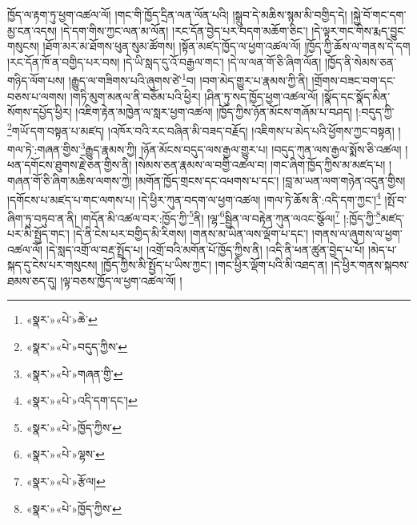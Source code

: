 ཁྱོད་ལ་རྟག་ཏུ་ཕྱག་འཚལ་ལོ། །གང་གི་ཁྱོད་དྲིན་ལན་ལོན་པའི། །སྒྲུབ་དེ་མཆིས་སྙམ་མི་བགྱིད་དེ། །སྐྱེ་བོ་གང་དག་མྱ་ངན་འདས། །དེ་དག་གིས་ཀྱང་ལན་མ་ལོན། །རང་དོན་བྱེད་པར་བདག་མཆོག་ཅིང་། །དེ་ལྟར་གང་གིས་རྨད་བྱུང་གསུངས། །ཐོག་མར་མ་ཐོགས་ཕུན་སུམ་ཚོགས། །སྟོན་མཛད་ཁྱོད་ལ་ཕྱག་འཚལ་ལོ། །ཁྱོད་ཀྱི་ཆོས་ལ་གནས་དེ་དག །རང་དོན་ཁོ་ན་བགྱིད་པར་བས། །དེ་ཡི་སླད་དུ་འོ་བརྒྱལ་གང་། །དེ་ལ་ལན་གོ་ཅི་ཞིག་ལོན། །ཁྱོད་ནི་སེམས་ཅན་གཉིད་ལོག་པས། །རྒྱུད་ལ་གཟིགས་པའི་ཞུགས་ཙེ་\footnote{«སྣར་»«པེ་»ཆེ་}བ། །བག་མེད་གྱུར་པ་རྣམས་ཀྱི་ནི། །གྲོགས་བཟང་བག་དང་བཅས་པ་ལགས། །གཏི་མུག་མནལ་ནི་བཅོམ་པའི་ཕྱིར། །ཤིན་ཏུ་སད་ཁྱོད་ཕྱག་འཚལ་ལོ། །སྣོད་དང་སྣོད་མིན་སོགས་དཔྱོད་ཕྱིར། །འཇིག་རྟེན་མཁྱེན་ལ་སླར་ཕྱག་འཚལ། །ཁྱོད་ཀྱིས་ཉོན་མོངས་གཞོམ་པ་བཤད། །:བདུད་ཀྱི་\footnote{«སྣར་»«པེ་»བདུད་ཀྱིས་}གཡོ་དག་བསྟན་པ་མཛད། །འཁོར་བའི་རང་བཞིན་མི་བཟད་བརྗོད། །འཇིགས་པ་མེད་པའི་ཕྱོགས་ཀྱང་བསྟན། །གལ་ཏེ་:གཞན་གྱིས་\footnote{«སྣར་»«པེ་»གཞན་གྱི་}རྒྱུད་རྣམས་ཀྱི། །ཉོན་མོངས་བདུད་ལས་རྒྱལ་གྱུར་པ། །བདུད་ཀུན་ལས་རྒྱལ་སྨོས་ཅི་འཚལ། །ཕན་དགོངས་ཐུགས་རྗེ་ཅན་གྱིས་ནི། །སེམས་ཅན་རྣམས་ལ་བགྱི་འཚལ་བ། །གང་ཞིག་ཁྱོད་ཀྱིས་མ་མཛད་པ། །གཞན་གོ་ཅི་ཞིག་མཆིས་ལགས་ཀྱེ། །མགོན་ཁྱོད་གྲངས་དང་འཕགས་པ་དང་། །བླ་མ་ཡན་ལག་གཉེན་འདུན་གྱིས། །དགོངས་པ་མཛད་པ་གང་ལགས་པ། །དེ་ཕྱིར་ཀུན་བདག་ལ་ཕྱག་འཚལ། །གལ་ཏེ་ཆོས་ནི་:འདི་དག་ཀྱང་།\footnote{«སྣར་»«པེ་»འདི་དག་དང་།} །སྤོ་བ་ཞིག་ཏུ་བཏུབ་ན་ནི། །གདོན་མི་འཚལ་བར་:ཁྱོད་ཀྱི་\footnote{«སྣར་»«པེ་»ཁྱོད་ཀྱིས་}ནི། །ལྷ་\footnote{«སྣར་»«པེ་»ལྷས་}སྦྱིན་ལ་བརྟེན་ཀུན་ལའང་སྩོལ།\footnote{«སྣར་»«པེ་»རྩོལ།} །:ཁྱོད་ཀྱི་\footnote{«སྣར་»«པེ་»ཁྱོད་ཀྱིས་}མཛད་པར་མི་སྤྱོད་གང་། །དེ་ནི་ངེས་པར་བགྱིད་མི་རིགས། །གནས་མ་ཡིན་ལས་ལྡོག་པ་དང་། །གནས་ལ་ཞུགས་ལ་ཕྱག་འཚལ་ལོ། །དེ་སླད་འགྲོ་ལ་བརྡ་སྤྲོད་པ། །འགྲོ་བའི་མགོན་པོ་ཁྱོད་ཀྱིས་ནི། །འདི་ནི་ཕན་ཚུན་བྱེད་པ་པོ། །མེད་པ་སྐད་དུ་ངེས་པར་གསུངས། །ཁྱོད་ཀྱིས་མི་སྤྱོད་པ་ཡིས་ཀྱང་། །གང་ཕྱིར་ལྡོག་པའི་མི་འཐད་ན། །དེ་ཕྱིར་གནས་སྐབས་ཐམས་ཅད་དུ། །ལྟ་བཅས་ཁྱོད་ལ་ཕྱག་འཚལ་ལོ། །
